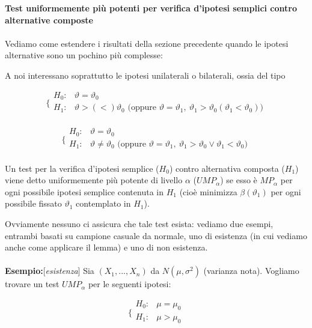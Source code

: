 
\noindent \textbf{Test uniformemente più potenti per verifica d'ipotesi semplici contro alternative composte}\\
\\
Vediamo come estendere i risultati della sezione precedente quando le ipotesi alternative sono un pochino più complesse:

A noi interessano soprattutto le ipotesi unilaterali o bilaterali, ossia del tipo

$$\bigg \{
\begin{array}{rl}
H_0: & \vartheta = \vartheta_0 \\
H_1: & \vartheta > (<) \vartheta_0 \text{ (oppure } \vartheta = \vartheta_1,\ \vartheta_1 > \vartheta_0 (\vartheta_1 < \vartheta_0) )\\
\end{array}
$$

$$\bigg \{
\begin{array}{rl}
H_0: & \vartheta = \vartheta_0 \\
H_1: & \vartheta \neq \vartheta_0 \text{ (oppure } \vartheta = \vartheta_1,\ \vartheta_1 > \vartheta_0 \vee \vartheta_1 < \vartheta_0 )\\
\end{array}
$$

\begin{definizione}
Un test per la verifica d'ipotesi semplice ($H_0$) contro alternativa composta ($H_1$) viene detto uniformemente più potente di livello $\alpha$ ($UMP_\alpha$) se esso è $MP_\alpha$ per ogni possibile ipotesi semplice contenuta in $H_1$ (cioè minimizza $\beta(\vartheta_1)$ per ogni possibile fissato $\vartheta_1$ contemplato in $H_1$).
\end{definizione}

Ovviamente nessuno ci assicura che tale test esista: vediamo due esempi, entrambi basati su campione casuale da normale, uno di esistenza (in cui vediamo anche come applicare il lemma) e uno di non esistenza.\\
\\
\textbf{Esempio:}[\textit{esistenza}] Sia $(X_1,...,X_n)$ da $N(\mu,\sigma^2)$ (varianza nota).
Vogliamo trovare un test $UMP_\alpha$ per le seguenti ipotesi:

$$\bigg \{
\begin{array}{rl}
H_0: & \mu = \mu_0 \\
H_1: & \mu > \mu_0 \\
\end{array}
$$

